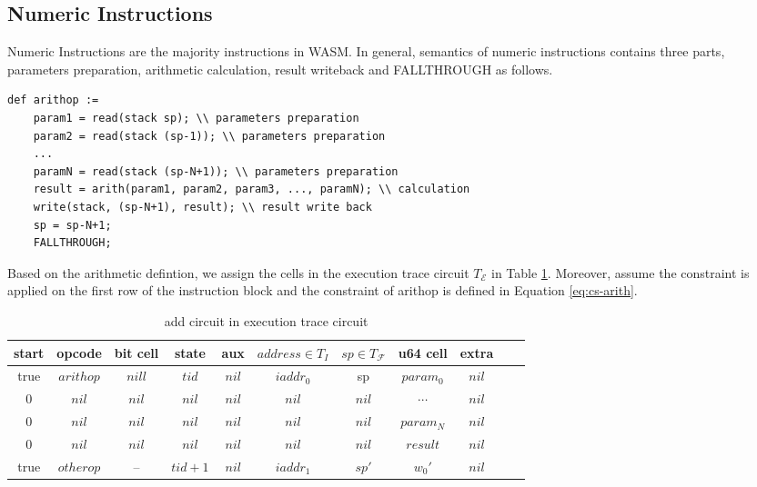 \subsection{Numeric Instructions}
\label{chp:numeric-instruction}
Numeric Instructions are the majority instructions in WASM. In general, semantics of numeric instructions contains three parts, parameters preparation, arithmetic calculation, result writeback and FALLTHROUGH as follows.
\begin{verbatim}
def arithop :=
    param1 = read(stack sp); \\ parameters preparation
    param2 = read(stack (sp-1)); \\ parameters preparation
    ...
    paramN = read(stack (sp-N+1)); \\ parameters preparation
    result = arith(param1, param2, param3, ..., paramN); \\ calculation
    write(stack, (sp-N+1), result); \\ result write back
    sp = sp-N+1;
    FALLTHROUGH;
\end{verbatim}
Based on the arithmetic defintion, we assign the cells in the execution trace circuit $T_\mathcal{E}$ in Table \ref{tbl:arith-instruction}. Moreover, assume the constraint is applied on the first row of the instruction block and the constraint of arithop is defined in Equation \ref{eq:cs-arith}.
\begin{table}[!h]
\begin{center}
\begin{tabular}{ | c | c | c | c | c | c | c | c | c | c | c | }
  \hline
  start & opcode & bit cell & state & aux & $address \in T_{I}$ & $sp \in T_\mathcal{F}$& u64 cell & extra \\ 
  \hline
   true & $arithop$ & $nill$ & $tid$ & $nil$ & $iaddr_0$ & sp & $param_0$ & $nil$\\ 
 \hline
   0 & $nil$ & $nil$ & $nil$ & $nil$ & $nil$ & $nil$ & $\cdots$ & $nil$\\ 
 \hline
   0 & $nil$ & $nil$ & $nil$ & $nil$ & $nil$ & $nil$ & $param_N$ & $nil$\\ 
 \hline
   0 & $nil$ & $nil$ & $nil$ & $nil$ & $nil$ & $nil$ & $result$ & $nil$\\ 
 \hline
    true & $otherop$ & -- & $tid+1$ & $nil$ & $iaddr_1$ & $sp'$ & $w_0'$ & $nil$\\
 \hline
\end{tabular}
\caption{add circuit in execution trace circuit}
\label{tbl:arith-instruction}
\end{center}
\end{table}
